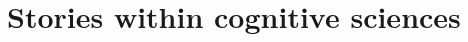 \documentclass[
		twoside,openright,titlepage,numbers=noenddot,manychapters,
		headinclude,%
                footinclude=false,cleardoublepage=empty,
                BCOR=5mm,
		fontsize=11pt, %
                 enabledeprecatedfontcommands]{scrreprt}
\begin{document}





\section{Stories within cognitive sciences}




\label{embod_cog}
\label{intro_embodied}
\end{document}
